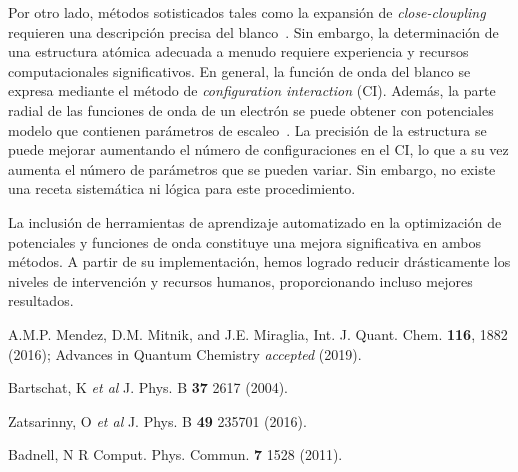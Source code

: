 \documentclass[11pt]{article}
\newcommand{\abstracttext}[1]{\vspace{0.5cm}\columnsep0.75cm \begin{multicols}{2} #1 \end{multicols}}
\begin{document}
{Por otro lado, métodos sotisticados tales como la expansión 
de {\em close-cloupling} requieren una descripción precisa del 
blanco~\cite{Bartschat:04,Zatsarinny:16}. 
Sin embargo, la determinación de una estructura 
atómica adecuada a menudo requiere experiencia y recursos 
computacionales significativos. En general, la función de onda del 
blanco se expresa 
mediante el método de {\em configuration interaction} (CI). Además,
la parte radial de las funciones de onda de un electrón se puede 
obtener con potenciales modelo que contienen parámetros de 
escaleo~\cite{Badnell:11}.
La precisión de la estructura se puede mejorar aumentando el número 
de configuraciones en el CI, lo que a su vez aumenta el número de
parámetros que se pueden variar. Sin embargo, no existe una receta
sistemática ni lógica para este procedimiento. 

La inclusión de herramientas de aprendizaje automatizado en la 
optimización de potenciales y funciones de onda constituye una 
mejora significativa en ambos métodos. A partir de su 
implementación, hemos logrado reducir drásticamente los niveles 
de intervención y recursos humanos, proporcionando incluso 
mejores resultados.



\begin{thebibliography}{99}
A.M.P. Mendez, D.M. Mitnik, and J.E. Miraglia, 
Int. J. Quant. Chem. {\bf 116}, 1882 (2016); 
Advances in Quantum Chemistry \textit{accepted} (2019).

Bartschat, K {\em et al} J. Phys. B {\bf 37} 2617 (2004).

Zatsarinny, O {\em et al} 
J. Phys. B {\bf 49} 235701 (2016).

Badnell, N R 
Comput. Phys. Commun. {\bf 7} 1528 (2011).

\end{thebibliography}

% 
% 

}%

\end{document}
